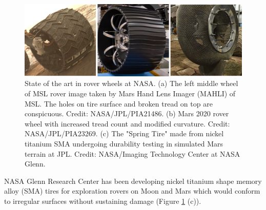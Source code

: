 \documentclass{article}
\begin{document}
\begin{figure}[hbt!]
    \centering
    \includegraphics[]{general-images/mars_rover_wheels.png}
    \caption{State of the art in rover wheels at NASA. (a) The left middle wheel of MSL rover image taken by Mars Hand Lens Imager (MAHLI) of MSL. The holes on tire surface and broken tread on top are conspicuous. Credit: NASA/JPL/PIA21486. (b) Mars 2020 rover wheel with increased tread count and modified curvature. Credit: NASA/JPL/PIA23269. (c) The "Spring Tire" made from nickel titanium SMA undergoing durability testing in simulated Mars terrain at JPL. Credit: NASA/Imaging Technology Center at NASA Glenn.}
    \label{soa_wheels}
\end{figure}

NASA Glenn Research Center has been developing nickel titanium shape memory alloy (SMA) tires for exploration rovers on Moon and Mars which would conform to irregular surfaces without sustaining damage (Figure \ref{soa_wheels} (c)). 
\end{document}
